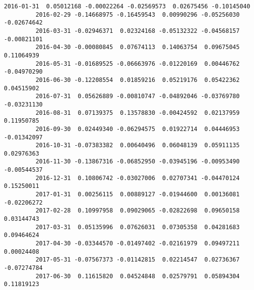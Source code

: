 \documentclass[11pt]{article}
\begin{document}
\begin{Verbatim}[commandchars=\\\{\}]
         2016-01-31  0.05012168 -0.00022264 -0.02569573  0.02675456 -0.10145040   
         2016-02-29 -0.14668975 -0.16459543  0.00990296 -0.05256030 -0.02674642   
         2016-03-31 -0.02946371  0.02324168 -0.05132322 -0.04568157 -0.00821101   
         2016-04-30 -0.00080845  0.07674113  0.14063754  0.09675045  0.11064939   
         2016-05-31 -0.01689525 -0.06663976 -0.01220169  0.00446762 -0.04970290   
         2016-06-30 -0.12208554  0.01859216  0.05219176  0.05422362  0.04515902   
         2016-07-31  0.05626889 -0.00810747 -0.04892046 -0.03769780 -0.03231130   
         2016-08-31  0.07139375  0.13578830 -0.00424592  0.02137959  0.11950785   
         2016-09-30  0.02449340 -0.06294575  0.01922714  0.04446953 -0.01342097   
         2016-10-31 -0.07383382  0.00640496  0.06048139  0.05911135  0.02976363   
         2016-11-30 -0.13867316 -0.06852950 -0.03945196 -0.00953490 -0.00544537   
         2016-12-31  0.10806742 -0.03027006  0.02707341 -0.04470124  0.15250011   
         2017-01-31  0.00256115  0.00889127 -0.01944600  0.00136081 -0.02206272   
         2017-02-28  0.10997958  0.09029065 -0.02822698  0.09650158  0.03144743   
         2017-03-31  0.05135996  0.07626031  0.07305358  0.04281683  0.09464624   
         2017-04-30 -0.03344570 -0.01497402 -0.02161979  0.09497211  0.00024408   
         2017-05-31 -0.07567373 -0.01142815  0.02214547  0.02736367 -0.07274784   
         2017-06-30  0.11615820  0.04524848  0.02579791  0.05894304  0.11819123   
         

\end{Verbatim}
\end{document}
